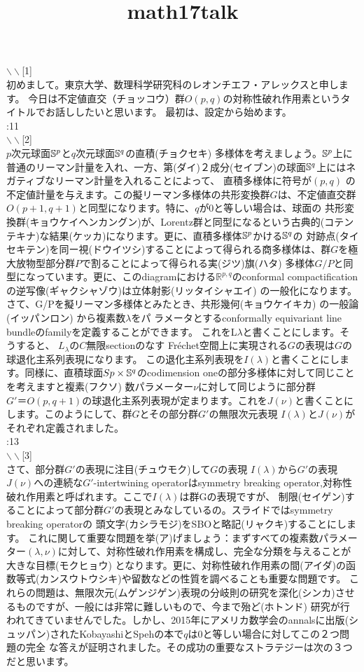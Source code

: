 \documentclass[11pt]{article} %
\title{math17talk}
\author{}
\date{} %
\newcommand{\slide}[1]{\noindent$\backslash\backslash$[#1]\\}
\newcommand{\mytime}[1]{\noindent #1\\}
\newcommand{\Sp}{\ensuremath \mathbb{S}^p}
\newcommand{\Sq}{\ensuremath \mathbb{S}^q}
\newcommand{\kana}[2]{#1{\scriptsize (#2)}}
\newcommand{\J}{$J(\nu)$}
\newcommand{\I}{$I(\lambda)$}
\newcommand{\doubt}[1]{\fbox{#1}}
\begin{document}
\slide{1}
初めまして。東京大学、数理科学研究科のレオンチエフ・アレックスと申します。
今日は不定値直交（チョッコウ）群$O(p,q)$の対称性破れ作用素というタイトルでお話ししたいと思います。
最初は、設定から始めます。\\
\mytime{0:11}

\slide{2}
$p$次元球面$\Sp$と$q$次元球面$\Sq$の\kana{直積}{チョクセキ}
多様体を考えましょう。$\Sp$上に普通のリーマン計量を入れ、一方、\kana{第}{ダイ}２\kana{成分}{セイブン}の球面$\Sq$上にはネガティブなリーマン計量を入れることによって、
直積多様体に符号が$(p,q)$
の不定値計量を与えます。この擬リーマン多様体の共形変換群$G$は、不定値直交群$O(p+1,q+1)$と同型になります。特に、$q$が0と等しい場合は、球面の
\kana{共形変換群}{キョウケイヘンカングン}が、Lorentz群と同型になるという\kana{古典的}{コテンテキナ}な\kana{結果}{ケッカ}になります。更に、直積多様体$\Sp$かける$\Sq$の
\kana{対跡点}{タイセキテン}を\kana{同ー視}{ドウイツシ}することによって得られる商多様体は、群$G$を極大放物型部分群$P$で割ることによって得られる\kana{実}{ジツ}\kana{旗}{ハタ}
多様体$G/P$と同型になっています。更に、このdiagramにおける$\mathbb{R}^{p,q}$のconformal compactificationの\kana{逆写像}{ギャクシャゾウ}は\kana{立体射影}{リッタイシャエイ}
の一般化になります。さて、G/Pを擬リーマン多様体とみたとき、\kana{共形幾何}{キョウケイキカ}
の\kana{一般論}{イッパンロン}
から複素数$\lambda$をパ
ラメータとするconformally equivariant line bundleのfamilyを定義することができます。
これをL$\lambda$と書くことにします。そうすると、
$L_\lambda$の$C$無限sectionのなす
Fr\'echet空間上に実現される$G$の表現は$G$の球退化主系列表現になります。
この退化主系列表現を$I(\lambda)$と書くことにします。同様に、直積球面$
Sp\times \Sq$のcodimension oneの部分多様体に対して同じことを考えますと\kana{複素}{フクソ}
数パラメーター$\nu$に対して同じように部分群$G'＝O(p,q+1)$の球退化主系列表現が定まります。これを$J(\nu)$と書くことにします。このようにして、群$G$とその部分群$G'$の無限次元表現
$I(\lambda)$と$J(\nu)$がそれぞれ定義されました。\\
\mytime{2:13}

\slide{3}
さて、部分群$G'$の表現に\kana{注目}{チュウモク}して$G$の表現
\I から$G'$の表現\J への連続な$G'$-intertwining operatorはsymmetry breaking operator,対称性破れ作用素と呼ばれます。ここで\I は群Gの表現ですが、
\kana{制限}{セイゲン}することによって部分群$G'$の表現とみなしているの\doubt{です}。スライドではsymmetry breaking operatorの
\kana{頭文字}{カシラモジ}を\doubt{とって}SBOと\kana{略記}{リャクキ}することにします。
これに関して重要な問題を\kana{挙}{ア}げましょう：まずすべての複素数パラメーター$(\lambda,\nu)$に対して、対称性破れ作用素を構成し、完全な分類を与えることが大きな\kana{目標}{モクヒョウ}
となります。更に、対称性破れ作用素の\kana{間}{アイダ}の\kana{函数等式}{カンスウトウシキ}や留数などの性質を調べることも重要な問題です。
これらの問題は、\kana{無限次元}{ムゲンジゲン}表現の分岐則の研究を\kana{深化}{シンカ}させるものですが、一般には非常に難しいもので、今まで\kana{殆ど}{ホトンド}
研究が行われてきていませんでした。しかし、2015年にアメリカ数学会のannalsに\kana{出版}{シュッパン}されたKobayashiとSpehの本で$q$は0と等しい場合に対してこの２つ問題の完全
な答えが証明されました。その成功の重要なストラテジーは次の３つだと思います。\\
\end{document}
